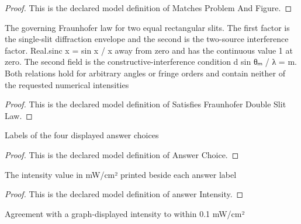 \begin{proof}
  This is the declared model definition of Matches Problem And Figure.
\end{proof}
\begin{definition}
  \label{def:physics:phyx-mini-0082:phyxminiproblems-problemphyxmini0082-satisfiesfraunhoferdoubleslitlaw}
  The governing Fraunhofer law for two equal rectangular slits. The first factor is the single-slit diffraction envelope and the second is the two-source interference factor. Real.sinc x = sin x / x away from zero and has the continuous value 1 at zero. The second field is the constructive-interference condition d sin θₘ / λ = m. Both relations hold for arbitrary angles or fringe orders and contain neither of the requested numerical intensities
\end{definition}
\begin{proof}
  This is the declared model definition of Satisfies Fraunhofer Double Slit Law.
\end{proof}
\begin{definition}
  \label{def:physics:phyx-mini-0082:phyxminiproblems-problemphyxmini0082-answerchoice}
  Labels of the four displayed answer choices
\end{definition}
\begin{proof}
  This is the declared model definition of Answer Choice.
\end{proof}
\begin{definition}
  \label{def:physics:phyx-mini-0082:phyxminiproblems-problemphyxmini0082-answerintensity}
  The intensity value in mW/cm² printed beside each answer label
\end{definition}
\begin{proof}
  This is the declared model definition of answer Intensity.
\end{proof}
\begin{definition}
  \label{def:physics:phyx-mini-0082:phyxminiproblems-problemphyxmini0082-agreeswithdisplayedintensity}
  Agreement with a graph-displayed intensity to within 0.1 mW/cm²
\end{definition}
